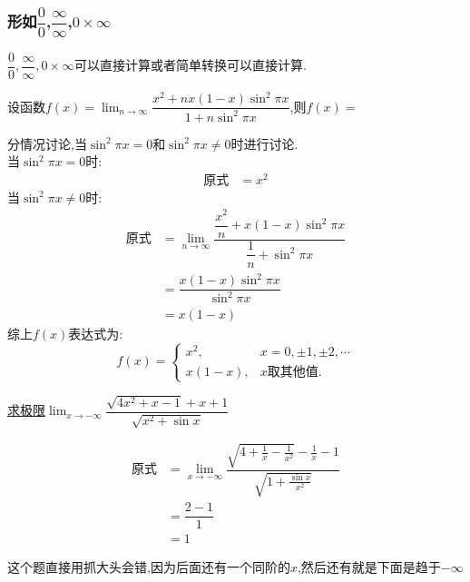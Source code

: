 \documentclass[8pt a4paper, oneside, UTF8]{ctexbook}
\begin{document}
\begin{sloppypar}
    \subsubsection{形如$\dfrac{0}{0}$,$\dfrac{\infty}{\infty}$,$0 \times \infty$}
         $\dfrac{0}{0},\dfrac{\infty}{\infty},0 \times \infty$可以直接计算或者简单转换可以直接计算.
    \begin{problem}
        设函数$f(x)=\operatorname*{lim}_{n\to\infty} \dfrac{x^2+nx(1-x)\sin^2\pi x}{1+n\sin^{2}\pi x}$,则$f(x)=$        
    \end{problem}
    \begin{solution}
        分情况讨论,当$\sin^2 \pi x=0$和$\sin^2 \pi x \neq 0$时进行讨论.\\
        当$\sin^2 \pi x=0$时:
        \begin{align*}
          \text{原式} & = x^2
        \end{align*}
        当$\sin^2 \pi x \neq 0$时:
        \begin{align*}
          \text{原式} & =\lim_{n\to\infty}\dfrac{\dfrac{x^{2}}{n}+x(1-x)\sin^{2}\pi x}{\dfrac{1}{n}+\sin^{2}\pi x}\\
          & =\dfrac{x(1-x)\sin^{2}\pi x}{\sin^{2}\pi x}\\
          & =x(1-x)    
        \end{align*}
        综上$f(x)$表达式为: $$f(x)=\begin{cases}x^2,&x=0, \pm1, \pm2, \cdots\\x(1-x),&x\text{取其他值}.\end{cases}$$
    \end{solution}
    \begin{problem}
        \uline{求极限}$\lim_{x\to-\infty}\dfrac{\sqrt{4x^2+x-1}+x+1}{\sqrt{x^2+\sin x}}$
    \end{problem}
    \begin{solution}
        \begin{align*}
          \text{原式} & = \lim_{x\to-\infty} \dfrac{\sqrt{4+\frac{1}{x}-\frac{1}{x^2}}-\frac{1}{x}-1}{\sqrt{1+\frac{\sin x}{x^2}}}\\
          & =  \dfrac{2-1}{1}\\
          & = 1
        \end{align*}
    \end{solution}
    \begin{note}
        这个题直接用抓大头会错,因为后面还有一个同阶的$x$,然后还有就是下面是趋于$- \infty$
    \end{note}

\end{sloppypar}
\end{document}
